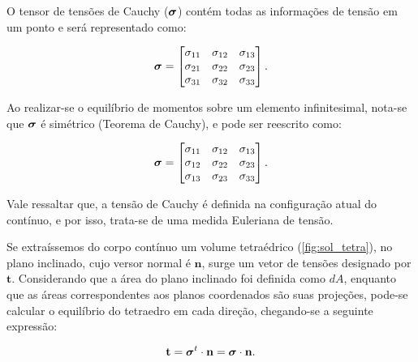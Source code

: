 O tensor de tensões de Cauchy ($\bm{\sigma}$) contém todas as informações de tensão em um ponto e será representado como:

\begin{align}
\bm{\sigma} =
\begin{bmatrix}
	\sigma_{11} & \sigma_{12} & \sigma_{13} \\
	\sigma_{21} & \sigma_{22} & \sigma_{23} \\
	\sigma_{31} & \sigma_{32} & \sigma_{33}
\end{bmatrix}
.
\end{align}

Ao realizar-se o equilíbrio de momentos sobre um elemento infinitesimal, nota-se que $\bm{\sigma}$ é simétrico (Teorema de Cauchy), e pode ser reescrito como:

\begin{align}
	\bm{\sigma} =
	\begin{bmatrix}
		\sigma_{11} & \sigma_{12} & \sigma_{13} \\
		\sigma_{12} & \sigma_{22} & \sigma_{23} \\
		\sigma_{13} & \sigma_{23} & \sigma_{33}
	\end{bmatrix}
	.
\end{align}

Vale ressaltar que, a tensão de Cauchy é definida na configuração atual do contínuo, e por isso, trata-se de uma medida Euleriana de tensão.

Se extraíssemos do corpo contínuo um volume tetraédrico (\autoref{fig:sol_tetra}), no plano inclinado, cujo versor normal é $\mathbf{n}$, surge um vetor de tensões designado por $\mathbf{t}$. Considerando que a área do plano inclinado foi definida como $dA$, enquanto que as áreas correspondentes aos planos coordenados são suas projeções, pode-se calcular o equilíbrio do tetraedro em cada direção, chegando-se a seguinte expressão:

\begin{align}
	\mathbf{t} = \bm{\sigma}^{t} \cdot \mathbf{n} =  \bm{\sigma} \cdot \mathbf{n}.
\end{align}

